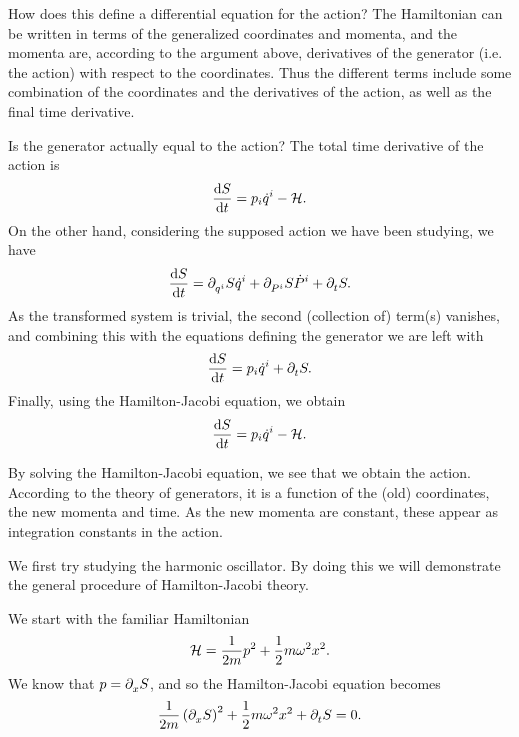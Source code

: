 How does this define a differential equation for the action? The Hamiltonian can be written in terms of the generalized coordinates and momenta, and the momenta are, according to the argument above, derivatives of the generator (i.e. the action) with respect to the coordinates. Thus the different terms include some combination of the coordinates and the derivatives of the action, as well as the final time derivative.

Is the generator actually equal to the action? The total time derivative of the action is
\begin{align*}
	\dv{S}{t} = p_{i}\dot{q}^{i} - \mathcal{H}.
\end{align*}
On the other hand, considering the supposed action we have been studying, we have
\begin{align*}
	\dv{S}{t} = \partial^{}_{q^{i}}S\dot{q}^{i} + \partial^{}_{P^{i}}S\dot{P}^{i} + \partial^{}_{t}S.
\end{align*}
As the transformed system is trivial, the second (collection of) term(s) vanishes, and combining this with the equations defining the generator we are left with
\begin{align*}
	\dv{S}{t} = p_{i}\dot{q}^{i} + \partial^{}_{t}S.
\end{align*}
Finally, using the Hamilton-Jacobi equation, we obtain
\begin{align*}
	\dv{S}{t} = p_{i}\dot{q}^{i} - \mathcal{H}.
\end{align*}

By solving the Hamilton-Jacobi equation, we see that we obtain the action. According to the theory of generators, it is a function of the (old) coordinates, the new momenta and time. As the new momenta are constant, these appear as integration constants in the action.

We first try studying the harmonic oscillator. By doing this we will demonstrate the general procedure of Hamilton-Jacobi theory.

We start with the familiar Hamiltonian
\begin{align*}
	\mathcal{H} = \frac{1}{2m}p^{2} + \frac{1}{2}m\omega^{2}x^{2}.
\end{align*}
We know that $p = \partial^{}_{x}S$, and so the Hamilton-Jacobi equation becomes
\begin{align*}
	\frac{1}{2m}\left(\partial^{}_{x}S\right)^{2} + \frac{1}{2}m\omega^{2}x^{2} + \partial^{}_{t}S = 0.
\end{align*}


